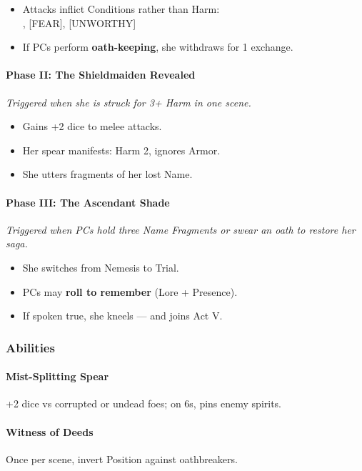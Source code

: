 \documentclass[11pt]{article}
\begin{document}
\begin{itemize}
    \item Attacks inflict Conditions rather than Harm:\\
    [REVERENCE], [FEAR], [UNWORTHY]
    \item If PCs perform \textbf{oath-keeping}, she withdraws for 1 exchange.
\end{itemize}

\paragraph*{Phase II: The Shieldmaiden Revealed}
\textit{Triggered when she is struck for 3+ Harm in one scene.}

\begin{itemize}
    \item Gains +2 dice to melee attacks.
    \item Her spear manifests: Harm 2, ignores Armor.
    \item She utters fragments of her lost Name.
\end{itemize}

\paragraph*{Phase III: The Ascendant Shade}
\textit{Triggered when PCs hold three Name Fragments or swear an oath to restore her saga.}

\begin{itemize}
    \item She switches from Nemesis to Trial.
    \item PCs may \textbf{roll to remember} (Lore + Presence).
    \item If spoken true, she kneels --- and joins Act V.
\end{itemize}

\subsubsection*{Abilities}

\paragraph*{Mist-Splitting Spear}
+2 dice vs corrupted or undead foes; on 6s, pins enemy spirits.

\paragraph*{Witness of Deeds}
Once per scene, invert Position against oathbreakers.
\end{document}
